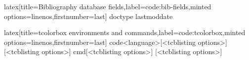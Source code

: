%
\begin{code}{latex}[title={Bibliography database fields},label=code:bib-fields,minted options={linenos,firstnumber=last}]
doctype
lastmoddate
\end{code}
%
\begin{code}{latex}[title={tcolorbox environments and commands},label=code:tcolorbox,minted options={linenos,firstnumber=last}]
{code}{<language>}[<tcblisting options>]
[<tcblisting options>]
{cmd}[<tcblisting options>]
[<tcblisting options>]
\end{code}

\begin{comment}

\clearpage
\subsection{subsection 1}

\section{Test appendix 2}

\section{Test appendix 3}
\clearpage
\subsection{subsection 1}
\clearpage
\subsection{subsection 2}
\clearpage

\end{comment}

